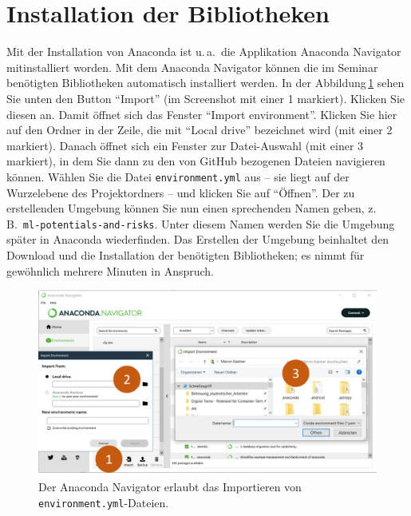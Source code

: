 \documentclass[nobib]{tufte-handout}
\begin{document}
\section{Installation der Bibliotheken}

Mit der Installation von Anaconda ist u.\,a.\ die Applikation Anaconda Navigator mitinstalliert worden.
Mit dem Anaconda Navigator können die im Seminar benötigten Bibliotheken automatisch installiert werden.
In der Abbildung\,\ref{fig:anaconda-navigator} sehen Sie unten den Button \enquote{Import}
(im Screenshot mit einer 1 markiert).
Klicken Sie diesen an.
Damit öffnet sich das Fenster \enquote{Import environment}.
Klicken Sie hier auf den Ordner in der Zeile, die mit 
\enquote{Local drive}
bezeichnet wird (mit einer 2 markiert).
Danach öffnet sich ein Fenster zur Datei-Auswahl
(mit einer 3 markiert),
in dem Sie dann zu den von GitHub bezogenen Dateien navigieren können.
Wählen Sie die Datei \texttt{environment.yml} aus
-- sie liegt auf der Wurzelebene des Projektordners --
und klicken Sie auf \enquote{Öffnen}.
Der zu erstellenden Umgebung können Sie nun einen sprechenden Namen geben, z.\,B.\ \texttt{ml-potentials-and-risks}.
Unter diesem Namen werden Sie die Umgebung später in Anaconda wiederfinden.
Das Erstellen der Umgebung beinhaltet den Download und die Installation der benötigten Bibliotheken; es nimmt für gewöhnlich mehrere Minuten in Anspruch.

\begin{figure}[h]
  \includegraphics{anaconda-navigator-import-new-environment--mit-reihenfolge}
  \caption{Der Anaconda Navigator erlaubt das Importieren von \texttt{environment.yml}-Dateien.}%
\label{fig:anaconda-navigator}
\end{figure}
\end{document}
